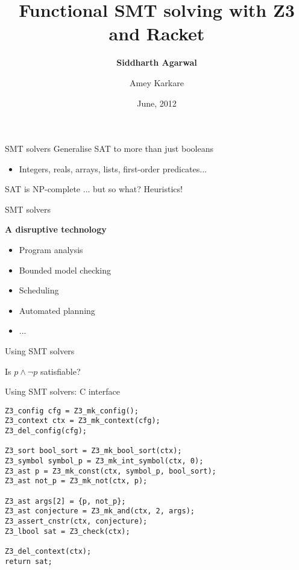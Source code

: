 \documentclass{beamer}
\title[Functional SMT solving]{Functional SMT solving with Z3 and Racket}
\author{\textbf{Siddharth Agarwal} \and Amey Karkare}
\institute{IIT Kanpur, India \\ \texttt{\{sagarwal,karkare\}@cse.iitk.ac.in}}
\date{June, 2012}
\begin{document}
\begin{frame}[plain]
  \titlepage
\end{frame}

\begin{frame}{SMT solvers}
Generalise SAT to more than just booleans

\begin{itemize}
\item Integers, reals, arrays, lists, first-order predicates...
\end{itemize}

SAT is NP-complete \pause ... but so what? Heuristics!
\end{frame}

\begin{frame}{SMT solvers}
\begin{center}
\textbf{A disruptive technology}
\end{center}
\pause
\begin{itemize}
\item Program analysis
\item Bounded model checking
\item Scheduling
\item Automated planning
\item ...
\end{itemize}
\end{frame}

\begin{frame}{Using SMT solvers}

\begin{center}
Is $p \wedge \neg p$ satisfiable?
\end{center}

\end{frame}

\begin{frame}[fragile]{Using SMT solvers: C interface}
\begin{verbatim}
Z3_config cfg = Z3_mk_config();
Z3_context ctx = Z3_mk_context(cfg);
Z3_del_config(cfg);

Z3_sort bool_sort = Z3_mk_bool_sort(ctx);
Z3_symbol symbol_p = Z3_mk_int_symbol(ctx, 0);
Z3_ast p = Z3_mk_const(ctx, symbol_p, bool_sort);
Z3_ast not_p = Z3_mk_not(ctx, p);

Z3_ast args[2] = {p, not_p};
Z3_ast conjecture = Z3_mk_and(ctx, 2, args);
Z3_assert_cnstr(ctx, conjecture);
Z3_lbool sat = Z3_check(ctx);

Z3_del_context(ctx);
return sat;
\end{verbatim}

\end{frame}
\end{document}
